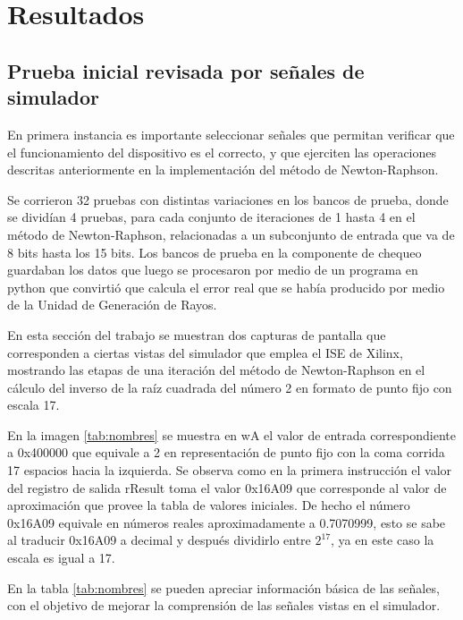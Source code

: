 \chapter{Resultados}

\section{Prueba inicial revisada por señales de simulador}

En primera instancia es importante seleccionar señales que permitan verificar que el funcionamiento del dispositivo es el correcto, y que ejerciten las operaciones descritas anteriormente en la implementación del método de Newton-Raphson.

Se corrieron 32 pruebas con distintas variaciones en los bancos de prueba, donde se dividían 4 pruebas, para cada conjunto de iteraciones de 1 hasta 4 en el método de Newton-Raphson, relacionadas a un subconjunto de entrada que va de 8 bits hasta los 15 bits. Los bancos de prueba en la componente de chequeo guardaban los datos que luego se procesaron por medio de un programa en python que convirtió que calcula el error real que se había producido por medio de la Unidad de Generación de Rayos.

En esta sección del trabajo se muestran dos capturas de pantalla que corresponden a ciertas vistas del simulador que emplea el ISE de Xilinx, mostrando las etapas de una iteración del método de Newton-Raphson en el cálculo del inverso de la raíz cuadrada del número 2 en formato de punto fijo con escala 17.

En la imagen \ref{tab:nombres} se muestra en wA el valor de entrada correspondiente a 0x400000 que equivale a 2 en representación de punto fijo con la coma corrida 17 espacios hacia la izquierda. Se observa como en la primera instrucción el valor del registro de salida rResult toma el valor 0x16A09 que corresponde al valor de aproximación que provee la tabla de valores iniciales. De hecho el número 0x16A09 equivale en números reales aproximadamente a 0.7070999, esto se sabe al traducir 0x16A09 a decimal y después dividirlo entre $2^{17}$, ya en este caso la escala es igual a 17.  

En la tabla \ref{tab:nombres} se pueden apreciar información básica de las señales, con el objetivo de mejorar la comprensión de las señales vistas en el simulador.

